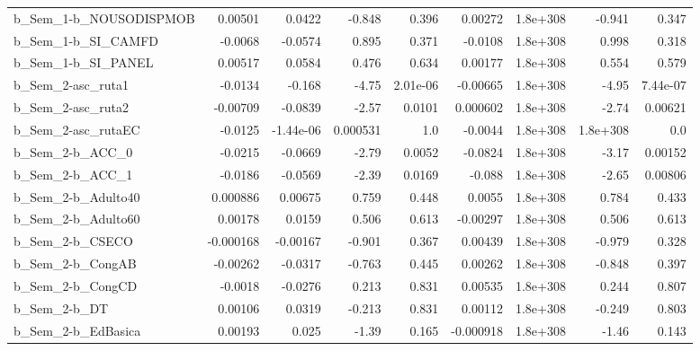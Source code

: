 \begin{tabular}{lrrrrrrrr}
b\_Sem\_1-b\_NOUSODISPMOB       &     0.00501 &       0.0422 &    -0.848 &    0.396 &    0.00272 &    1.8e+308 &       -0.941 &         0.347 \\
b\_Sem\_1-b\_SI\_CAMFD           &     -0.0068 &      -0.0574 &     0.895 &    0.371 &    -0.0108 &    1.8e+308 &        0.998 &         0.318 \\
b\_Sem\_1-b\_SI\_PANEL           &     0.00517 &       0.0584 &     0.476 &    0.634 &    0.00177 &    1.8e+308 &        0.554 &         0.579 \\
b\_Sem\_2-asc\_ruta1            &     -0.0134 &       -0.168 &     -4.75 & 2.01e-06 &   -0.00665 &    1.8e+308 &        -4.95 &      7.44e-07 \\
b\_Sem\_2-asc\_ruta2            &    -0.00709 &      -0.0839 &     -2.57 &   0.0101 &   0.000602 &    1.8e+308 &        -2.74 &       0.00621 \\
b\_Sem\_2-asc\_rutaEC           &     -0.0125 &    -1.44e-06 &  0.000531 &      1.0 &    -0.0044 &    1.8e+308 &     1.8e+308 &           0.0 \\
b\_Sem\_2-b\_ACC\_0              &     -0.0215 &      -0.0669 &     -2.79 &   0.0052 &    -0.0824 &    1.8e+308 &        -3.17 &       0.00152 \\
b\_Sem\_2-b\_ACC\_1              &     -0.0186 &      -0.0569 &     -2.39 &   0.0169 &     -0.088 &    1.8e+308 &        -2.65 &       0.00806 \\
b\_Sem\_2-b\_Adulto40           &    0.000886 &      0.00675 &     0.759 &    0.448 &     0.0055 &    1.8e+308 &        0.784 &         0.433 \\
b\_Sem\_2-b\_Adulto60           &     0.00178 &       0.0159 &     0.506 &    0.613 &   -0.00297 &    1.8e+308 &        0.506 &         0.613 \\
b\_Sem\_2-b\_CSECO              &   -0.000168 &     -0.00167 &    -0.901 &    0.367 &    0.00439 &    1.8e+308 &       -0.979 &         0.328 \\
b\_Sem\_2-b\_CongAB             &    -0.00262 &      -0.0317 &    -0.763 &    0.445 &    0.00262 &    1.8e+308 &       -0.848 &         0.397 \\
b\_Sem\_2-b\_CongCD             &     -0.0018 &      -0.0276 &     0.213 &    0.831 &    0.00535 &    1.8e+308 &        0.244 &         0.807 \\
b\_Sem\_2-b\_DT                 &     0.00106 &       0.0319 &    -0.213 &    0.831 &    0.00112 &    1.8e+308 &       -0.249 &         0.803 \\
b\_Sem\_2-b\_EdBasica           &     0.00193 &        0.025 &     -1.39 &    0.165 &  -0.000918 &    1.8e+308 &        -1.46 &         0.143 \\

\end{tabular}
